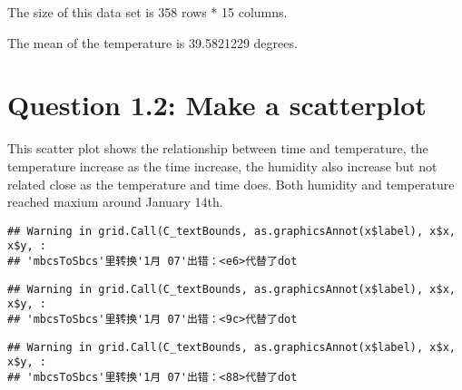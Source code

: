 \documentclass[
]{article}
\newenvironment{Shaded}{\begin{snugshade}}{\end{snugshade}}
\newcommand{\AttributeTok}[1]{\textcolor[rgb]{0.13,0.29,0.53}{#1}}
\newcommand{\FunctionTok}[1]{\textcolor[rgb]{0.13,0.29,0.53}{\textbf{#1}}}
\newcommand{\NormalTok}[1]{#1}
\newcommand{\OtherTok}[1]{\textcolor[rgb]{0.56,0.35,0.01}{#1}}
\newcommand{\SpecialCharTok}[1]{\textcolor[rgb]{0.81,0.36,0.00}{\textbf{#1}}}
\begin{document}
The size of this data set is 358 rows * 15 columns.

The mean of the temperature is 39.5821229 degrees.

\hypertarget{question-1.2-make-a-scatterplot}{%
\section{Question 1.2: Make a
scatterplot}\label{question-1.2-make-a-scatterplot}}

This scatter plot shows the relationship between time and temperature,
the temperature increase as the time increase, the humidity also
increase but not related close as the temperature and time does. Both
humidity and temperature reached maxium around January 14th.

\begin{Shaded}
\end{Shaded}

\begin{verbatim}
## Warning in grid.Call(C_textBounds, as.graphicsAnnot(x$label), x$x, x$y, :
## 'mbcsToSbcs'里转换'1月 07'出错：<e6>代替了dot
\end{verbatim}

\begin{verbatim}
## Warning in grid.Call(C_textBounds, as.graphicsAnnot(x$label), x$x, x$y, :
## 'mbcsToSbcs'里转换'1月 07'出错：<9c>代替了dot
\end{verbatim}

\begin{verbatim}
## Warning in grid.Call(C_textBounds, as.graphicsAnnot(x$label), x$x, x$y, :
## 'mbcsToSbcs'里转换'1月 07'出错：<88>代替了dot
\end{verbatim}
\end{document}
